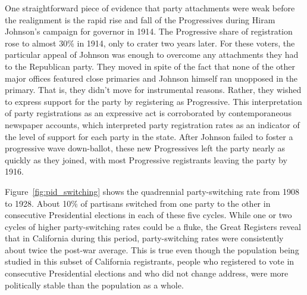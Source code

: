 \documentclass[11pt]{scrartcl}\usepackage[]{graphicx}\usepackage[]{color}
\begin{document}
One straightforward piece of evidence that party attachments were weak before the realignment is the rapid rise and fall of the Progressives during Hiram Johnson's campaign for governor in 1914.  The Progressive share of registration rose to almost 30\% in 1914, only to crater two years later.  For these voters, the particular appeal of Johnson was enough to overcome any attachments they had to the Republican party. They moved in spite of the fact that none of the other major offices featured close primaries and Johnson himself ran unopposed in the primary. That is, they didn't move for instrumental reasons. Rather, they wished to express support for the party by registering as Progressive. This interpretation of party registrations as an expressive act is corroborated by contemporaneous newspaper accounts, which interpreted party registration rates as an indicator of the level of support for each party in the state.   After Johnson failed to foster a progressive wave down-ballot, these new Progressives left the party nearly as quickly as they joined, with most Progressive registrants leaving the party by 1916.

Figure~\ref{fig:pid_switching} shows the quadrennial party-switching rate from 1908 to 1928. About 10\% of partisans switched from one party to the other in consecutive  Presidential elections in each of these five cycles.  While one or two cycles of higher party-switching rates could be a fluke, the Great Registers reveal that in California during this period, party-switching rates were consistently  about twice the post-war average. This is true even though the population being studied in this subset of California registrants, people who registered to vote in consecutive Presidential elections and who did not change address, were more politically stable than the population as a whole.
\end{document}
